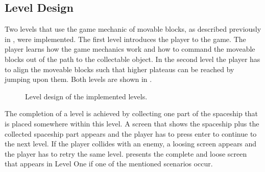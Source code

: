 \subsection{Level Design}\label{sec:game_design_level}
Two levels that use the game mechanic of movable blocks, as described previously in , were implemented.
The first level introduces the player to the game.
The player learns how the game mechanics work and how to command the moveable blocks out of the path to the collectable object.
In the second level the player has to align the moveable blocks such that higher plateaus can be reached by jumping upon them.
Both levels are shown in .
\begin{figure}[!ht]
  \centering
  \quad
  \caption{Level design of the implemented levels.}
  \label{fig:game_design_level}
\end{figure}
\FloatBarrier
\noindent
The completion of a level is achieved by collecting one part of the spaceship that is placed somewhere within this level.
A screen that shows the spaceship plus the collected spaceship part appears and the player has to press enter to continue to the next level.
If the player collides with an enemy, a loosing screen appears and the player has to retry the same level.
 presents the complete and loose screen that appears in Level One if one of the mentioned scenarios occur.
